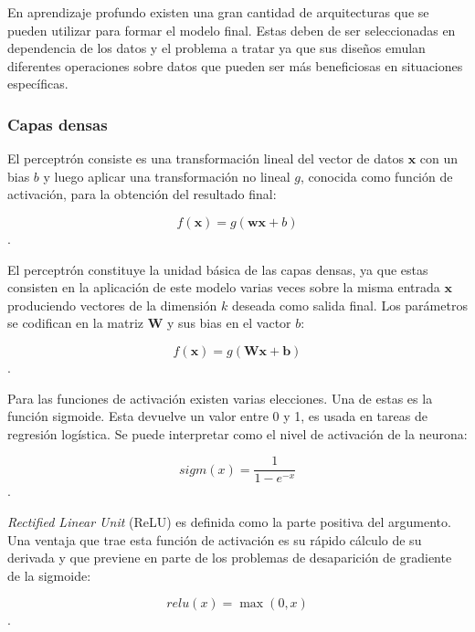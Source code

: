 En aprendizaje profundo existen una gran cantidad de arquitecturas que se pueden utilizar para formar el modelo 
final. Estas deben de ser seleccionadas en dependencia de los datos y el problema a tratar ya que sus diseños 
emulan diferentes operaciones sobre datos que pueden ser más beneficiosas en situaciones específicas.

\subsubsection{Capas densas}

El perceptrón consiste es una transformación lineal del vector de datos $\textbf{x}$ con un bias $b$ y 
luego aplicar una transformación no lineal $g$, conocida como función de activación, 
para la obtención del resultado final:

\begin{equation}
	f(\textbf{x}) = g(\textbf{w}\textbf{x} + b)
\end{equation}\label{eq:perceptron}.

El perceptrón constituye la unidad básica de las capas densas, ya que estas consisten en la aplicación
de este modelo varias veces sobre la misma entrada $\textbf{x}$ produciendo vectores de la dimensión $k$ 
deseada como salida final. Los parámetros se codifican en la matriz $\textbf{W}$ y sus bias en el vactor $b$:

\begin{equation}
	f(\textbf{x}) = g(\textbf{Wx} + \textbf{b})
\end{equation}\label{eq:dense}.

Para las funciones de activación existen varias elecciones. Una de estas es la función sigmoide. 
Esta devuelve un valor entre 0 y 1, es usada en tareas de regresión logística. 
Se puede interpretar como el nivel de activación de la neurona:

\begin{equation}
	sigm(x) = \frac{1}{1-e^{-x}}
\end{equation}\label{eq:sigmoide}.

\emph{Rectified Linear Unit} (ReLU) es definida como la parte positiva del argumento. Una ventaja que trae esta 
función de activación es su rápido cálculo de su derivada y que previene en parte de los problemas 
de desaparición de gradiente de la sigmoide:

\begin{equation}
	relu(x) = \max(0, x)
\end{equation}\label{eq:relu}.

